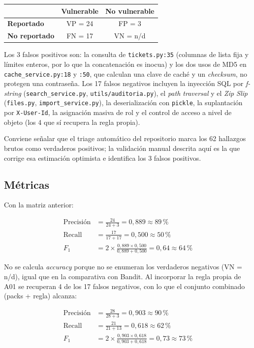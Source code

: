 \documentclass[11pt,letterpaper]{article}
\newcommand{\f}[1]{\texttt{#1}}
\newcommand{\enc}[1]{\textbf{#1}}
\begin{document}
\begin{center}
\begin{tabular}{lcc}
\toprule
 & \enc{Vulnerable} & \enc{No vulnerable} \\
\midrule
\enc{Reportado} & VP = 24 & FP = 3 \\
\enc{No reportado} & FN = 17 & VN = n/d \\
\bottomrule
\end{tabular}
\end{center}

Los 3 falsos positivos son: la consulta de \f{tickets.py:35} (columnas de lista fija y límites enteros, por lo que la concatenación es inocua) y los dos usos de MD5 en \f{cache\_service.py:18} y \f{:50}, que calculan una clave de caché y un \textit{checksum}, no protegen una contraseña. Los 17 falsos negativos incluyen la inyección SQL por \textit{f-string} (\f{search\_service.py}, \f{utils/auditoria.py}), el \textit{path traversal} y el \textit{Zip Slip} (\f{files.py}, \f{import\_service.py}), la deserialización con \f{pickle}, la suplantación por \f{X-User-Id}, la asignación masiva de rol y el control de acceso a nivel de objeto (los 4 que sí recupera la regla propia).

Conviene señalar que el triage automático del repositorio marca los 62 hallazgos brutos como verdaderos positivos; la validación manual descrita aquí es la que corrige esa estimación optimista e identifica los 3 falsos positivos.

\subsection{Métricas}

Con la matriz anterior:

\begin{align*}
\text{Precisión} &= \frac{24}{24+3}=0{,}889\approx 89\,\% \\
\text{Recall} &= \frac{17}{17+17}=0{,}500\approx 50\,\% \\
F_1 &= 2\times\frac{0{,}889\times 0{,}500}{0{,}889+0{,}500}=0{,}64\approx 64\,\%
\end{align*}

No se calcula \textit{accuracy} porque no se enumeran los verdaderos negativos (VN = n/d), igual que en la comparativa con Bandit. Al incorporar la regla propia de A01 se recuperan 4 de los 17 falsos negativos, con lo que el conjunto combinado (packs + regla) alcanza:

\begin{align*}
\text{Precisión} &= \frac{28}{28+3}=0{,}903\approx 90\,\% \\
\text{Recall} &= \frac{21}{21+13}=0{,}618\approx 62\,\% \\
F_1 &= 2\times\frac{0{,}903\times 0{,}618}{0{,}903+0{,}618}=0{,}73\approx 73\,\%
\end{align*}
\end{document}
